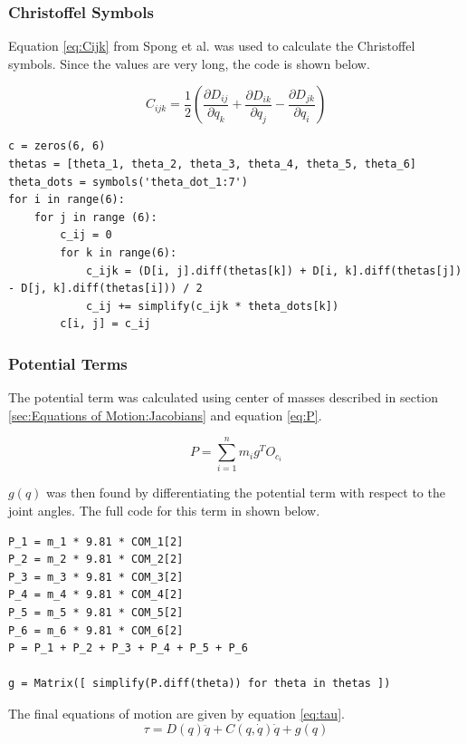 \documentclass[journal]{new-aiaa}
\begin{document}
\subsubsection{Christoffel Symbols}\label{sec:Equations of Motion:Cijk}
Equation \ref{eq:Cijk} from Spong et al. \cite{spong2020robot} was used to calculate the Christoffel symbols.
Since the values are very long, the code is shown below.

\begin{equation}\label{eq:Cijk}
    C_{ijk} = \frac{1}{2} \left( \frac{\partial D_{ij}}{\partial q_k} + \frac{\partial D_{ik}}{\partial q_j} - \frac{\partial D_{jk}}{\partial q_i} \right)
\end{equation}

\begin{verbatim}
c = zeros(6, 6)
thetas = [theta_1, theta_2, theta_3, theta_4, theta_5, theta_6]
theta_dots = symbols('theta_dot_1:7')
for i in range(6):
    for j in range (6):
        c_ij = 0
        for k in range(6):
            c_ijk = (D[i, j].diff(thetas[k]) + D[i, k].diff(thetas[j]) - D[j, k].diff(thetas[i])) / 2
            c_ij += simplify(c_ijk * theta_dots[k])
        c[i, j] = c_ij
\end{verbatim}

\subsubsection{Potential Terms}\label{sec:Equations of Motion:P}

The potential term was calculated using center of masses described in section \ref{sec:Equations of Motion:Jacobians} and equation \ref{eq:P}.

\begin{equation}\label{eq:P}
    P = \sum_{i=1}^{n} m_i g^T O_{c_i}
\end{equation}

$g(q)$ was then found by differentiating the potential term with respect to the joint angles. The full code for this term in shown below.

\begin{verbatim}
P_1 = m_1 * 9.81 * COM_1[2]
P_2 = m_2 * 9.81 * COM_2[2]
P_3 = m_3 * 9.81 * COM_3[2]
P_4 = m_4 * 9.81 * COM_4[2]
P_5 = m_5 * 9.81 * COM_5[2]
P_6 = m_6 * 9.81 * COM_6[2]
P = P_1 + P_2 + P_3 + P_4 + P_5 + P_6

g = Matrix([ simplify(P.diff(theta)) for theta in thetas ])
\end{verbatim}

The final equations of motion are given by equation \ref{eq:tau}.
\begin{equation}\label{eq:tau}
    \tau = D(q) \ddot{q} + C(q, \dot{q}) \dot{q} + g(q)
\end{equation}
\end{document}
